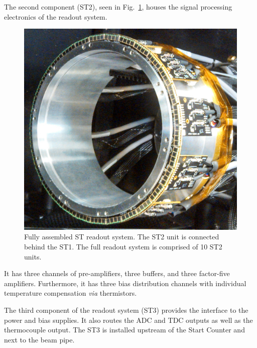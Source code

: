 The second component (ST2), seen in Fig.~\ref{fig:stfullreadout}, houses the signal processing electronics of the readout system.
	\begin{figure}[!htb]
		\centering
		\includegraphics[width=1.0\columnwidth]{design/figs/st_full_readout_v3}
		\caption{Fully assembled ST readout system.  The ST2 unit is connected behind the ST1.  The full readout system is comprised of 10 ST2 units.}
		\label{fig:stfullreadout}
	\end{figure}
It has three channels of pre-amplifiers, three buffers, and three factor-five amplifiers.  Furthermore, it has three bias distribution channels with individual temperature compensation \emph{via} thermistors. %

The third component of the readout system (ST3) provides the interface to the power and bias supplies.  It also routes the ADC and TDC outputs as well as the thermocouple output.  The ST3 is installed upstream of the Start Counter and next to the beam pipe.